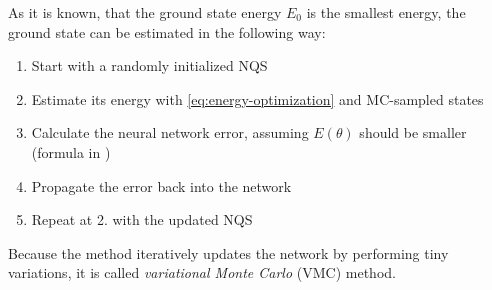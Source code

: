 As it is known, that the ground state energy $E_0$ is the smallest energy, the ground state can be estimated in the following way:
\begin{enumerate}
    \setlength\itemsep{-0.5em}
    \item Start with a randomly initialized NQS
    \item Estimate its energy with \autoref{eq:energy-optimization} and MC-sampled states
    \item Calculate the neural network error, assuming $E(\theta)$ should be smaller (formula in \cite{jVMCPaper})
    \item Propagate the error back into the network
    \item Repeat at 2. with the updated NQS
\end{enumerate}

Because the method iteratively updates the network by performing tiny variations, it is called \emph{variational Monte Carlo} (VMC) method.
